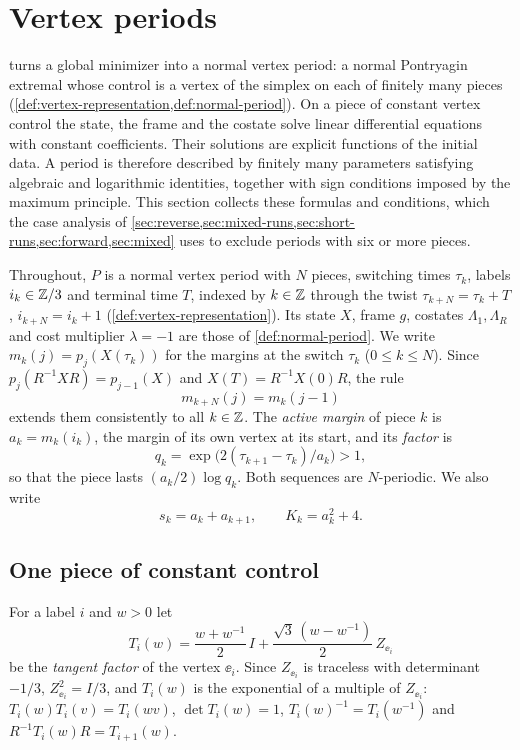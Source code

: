 \section{Vertex periods}\label{sec:periods}

 turns a global minimizer into a normal vertex period: a normal Pontryagin
extremal whose control is a vertex of the simplex on each of finitely many pieces
(\cref{def:vertex-representation,def:normal-period}). On a piece of constant vertex control the
state, the frame and the costate solve linear differential equations with constant coefficients.
Their solutions are explicit functions of the initial data. A period is therefore described by
finitely many parameters satisfying algebraic and logarithmic identities, together with sign
conditions imposed by the maximum principle. This section collects these formulas and conditions,
which the case analysis of \cref{sec:reverse,sec:mixed-runs,sec:short-runs,sec:forward,sec:mixed}
uses to exclude periods with six or more pieces.

Throughout, $P$ is a normal vertex period with $N$ pieces, switching times $\tau_k$, labels
$i_k\in\mathbb{Z}/3$ and terminal time $T$, indexed by $k\in\mathbb{Z}$ through the twist
$\tau_{k+N}=\tau_k+T$, $i_{k+N}=i_k+1$ (\cref{def:vertex-representation}). Its state $X$, frame
$g$, costates $\Lambda_1,\Lambda_R$ and cost multiplier $\lambda=-1$ are those of
\cref{def:normal-period}. We write $m_k(j)=p_j(X(\tau_k))$ for the margins at the switch
$\tau_k$ ($0\le k\le N$). Since $p_j(R^{-1}XR)=p_{j-1}(X)$ and
$X(T)=R^{-1}X(0)R$, the rule
\begin{equation}\label{eq:per-margin-twist}
  m_{k+N}(j)=m_k(j-1)
\end{equation}
extends them consistently to all $k\in\mathbb{Z}$. The \emph{active
margin} of piece $k$ is $a_k=m_k(i_k)$, the margin of its own vertex at its start, and its
\emph{factor} is
\[
  q_k=\exp\bigl(2(\tau_{k+1}-\tau_k)/a_k\bigr)>1,
\]
so that the piece lasts $(a_k/2)\log q_k$. Both sequences are
$N$-periodic. We also write
\[
  s_k=a_k+a_{k+1},\qquad K_k=a_k^2+4.
\]

\subsection{One piece of constant control}\label{sec:per-one-arc}

For a label $i$ and $w>0$ let
\[
  T_i(w)=\frac{w+w^{-1}}{2}\,I+\frac{\sqrt3\,(w-w^{-1})}{2}\,Z_{\ee_i}
\]
be the \emph{tangent factor} of the vertex $\ee_i$. Since $Z_{\ee_i}$ is traceless with
determinant $-1/3$, $Z_{\ee_i}^2=I/3$, and $T_i(w)$ is the exponential of a multiple of
$Z_{\ee_i}$: $T_i(w)T_i(v)=T_i(wv)$, $\det T_i(w)=1$, $T_i(w)^{-1}=T_i(w^{-1})$ and
$R^{-1}T_i(w)R=T_{i+1}(w)$.

